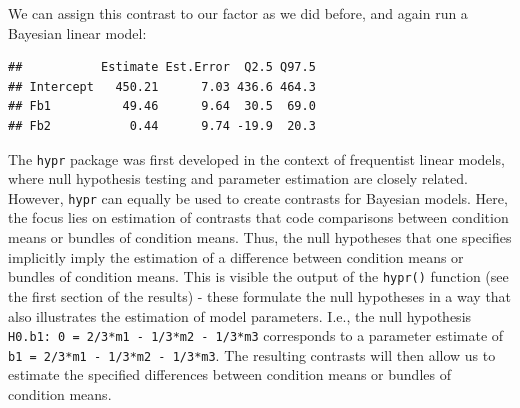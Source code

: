 \documentclass[12pt,]{krantz}
\newenvironment{Shaded}{\begin{snugshade}}{\end{snugshade}}
\newcommand{\DataTypeTok}[1]{\textcolor[rgb]{0.13,0.29,0.53}{#1}}
\newcommand{\DecValTok}[1]{\textcolor[rgb]{0.00,0.00,0.81}{#1}}
\newcommand{\KeywordTok}[1]{\textcolor[rgb]{0.13,0.29,0.53}{\textbf{#1}}}
\newcommand{\NormalTok}[1]{#1}
\newcommand{\OperatorTok}[1]{\textcolor[rgb]{0.81,0.36,0.00}{\textbf{#1}}}
\newcommand{\StringTok}[1]{\textcolor[rgb]{0.31,0.60,0.02}{#1}}
\theoremstyle{definition}
\theoremstyle{definition}
\theoremstyle{definition}
\theoremstyle{remark}
\begin{document}
We can assign this contrast to our factor as we did before, and again run a Bayesian linear model:

\begin{Shaded}
\end{Shaded}

\begin{verbatim}
##           Estimate Est.Error  Q2.5 Q97.5
## Intercept   450.21      7.03 436.6 464.3
## Fb1          49.46      9.64  30.5  69.0
## Fb2           0.44      9.74 -19.9  20.3
\end{verbatim}

The \texttt{hypr} package was first developed in the context of frequentist linear models, where null hypothesis testing and parameter estimation are closely related. However, \texttt{hypr} can equally be used to create contrasts for Bayesian models. Here, the focus lies on estimation of contrasts that code comparisons between condition means or bundles of condition means. Thus, the null hypotheses that one specifies implicitly imply the estimation of a difference between condition means or bundles of condition means. This is visible the output of the \texttt{hypr()} function (see the first section of the results) - these formulate the null hypotheses in a way that also illustrates the estimation of model parameters. I.e., the null hypothesis \texttt{H0.b1:\ 0\ =\ 2/3*m1\ -\ 1/3*m2\ -\ 1/3*m3} corresponds to a parameter estimate of \texttt{b1\ =\ 2/3*m1\ -\ 1/3*m2\ -\ 1/3*m3}. The resulting contrasts will then allow us to estimate the specified differences between condition means or bundles of condition means.
\end{document}
